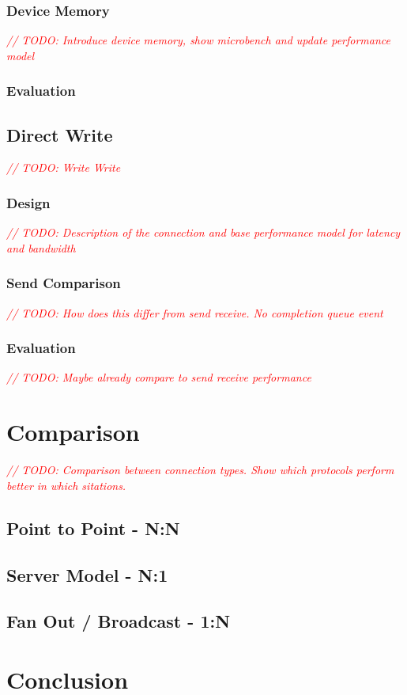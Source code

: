 \documentclass{article}
\newcommand{\todo}[1]{\textit{\textcolor{red}{// TODO: #1} }}
\theoremstyle{plain}
\theoremstyle{definition}
\theoremstyle{remark}
\begin{document}
\subsubsection{Device Memory}
\todo{Introduce device memory, show microbench and update performance model}
\subsubsection{Evaluation}

\pagebreak
\subsection{Direct Write}
\todo{Write Write}
\subsubsection{Design}
\todo{Description of the connection and base performance model for latency and bandwidth}
\subsubsection{Send Comparison}
\todo{How does this differ from send receive. No completion queue event}
\subsubsection{Evaluation}
\todo{Maybe already compare to send receive performance}

\pagebreak


\pagebreak



\pagebreak
\section{Comparison}
\todo{Comparison between connection types. Show which protocols perform better in which sitations.}

\subsection{Point to Point - N:N}

\subsection{Server Model - N:1}

\subsection{Fan Out / Broadcast - 1:N}

\pagebreak
\section{Conclusion}



\pagebreak


{}
\end{document}
